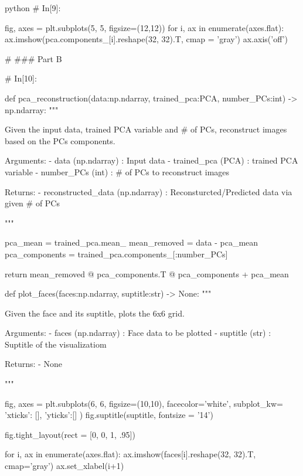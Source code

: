 \documentclass[12pt]{amsart}
\begin{document}
\begin{mintedbox}{python}
# In[9]:


fig, axes = plt.subplots(5, 5, figsize=(12,12))
for i, ax in enumerate(axes.flat):
    ax.imshow(pca.components_[i].reshape(32, 32).T, cmap = 'gray')
    ax.axis('off')


# ### Part B

# In[10]:


def pca_reconstruction(data:np.ndarray,
                       trained_pca:PCA,
                       number_PCs:int) -> np.ndarray:
    """
    
        Given the input data, trained PCA variable and # of PCs, reconstruct images based on the PCs components.
        
            
        Arguments:
            - data (np.ndarray) : Input data
            - trained_pca (PCA) : trained PCA variable
            - number_PCs (int)  : # of PCs to reconstruct images
            
        Returns:
            - reconstructed_data (np.ndarray) : Reconsturcted/Predicted data via given # of PCs
    
    
    """
    
    pca_mean = trained_pca.mean_ 
    mean_removed = data - pca_mean
    pca_components = trained_pca.components_[:number_PCs]
    
    return mean_removed @ pca_components.T @ pca_components + pca_mean


def plot_faces(faces:np.ndarray,
               suptitle:str) -> None:
    """
        
        Given the face and its suptitle, plots the 6x6 grid.
        
        Arguments:
            - faces       (np.ndarray) : Face data to be plotted
            - suptitle    (str)        : Suptitle of the visualizatiom
            
        Returns:
            - None

    """
    
    fig, axes = plt.subplots(6, 6, 
                             figsize=(10,10),
                             facecolor='white',
                             subplot_kw= {
                                 'xticks': [],
                                 'yticks':[]
                             }
    )
    fig.suptitle(suptitle,
                 fontsize = '14')
                 
    fig.tight_layout(rect = [0, 0, 1, .95])
    
    for i, ax in enumerate(axes.flat):
        ax.imshow(faces[i].reshape(32, 32).T, cmap='gray')
        ax.set_xlabel(i+1)



\end{mintedbox}
\end{document}
